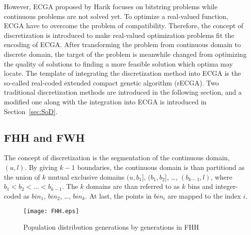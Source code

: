 However, ECGA proposed by Harik focuses on bitstring problems while
continuous problems are not solved yet.  To optimize a real-valued
function, ECGA have to overcome the problem of compatibility.
Therefore, the concept of discretization is introduced to make
real-valued optimization problems fit the encoding of ECGA.  After
transforming the problem from continuous domain to discrete domain, the
target of the problem is meanwhile changed from optimizing the quality
of solutions to finding a more feasible solution which optima may
locate.  The template of integrating the discretization method into ECGA
is the so-called real-coded extended compact genetic algorithm (rECGA).
Two traditional discretization methods are introduced in the following
section, and a modified one along with the integration into ECGA is
introduced in Section~\ref{sec:SoD}.  \subsection{FHH and FWH}

The concept of discretization is the segmentation of the continuous
domain, $(u,l)$.  By giving $k-1$ boundaries, the continuous domain is
than partitiond as the union of $k$ mutual exclusive domains $(u,b_1]$,
$(b_1,b_2]$, \ldots, $(b_{k-1},l)$, where $b_1 < b_2 < \ldots <
b_{k-1}$.  The $k$ domains are than referred to as $k$ bins and
integer-coded as $bin_1$, $bin_2$, \ldots, $bin_k$.  At last, the points
in $bin_i$ are mapped to the index $i$.



\begin{figure}[h] \begin{center}
    \texttt{[image: FHH.eps]}
    \caption{Population distribution generations by generations in FHH}
    \label{fig:FHH} 
  \end{center} 
\end{figure}

